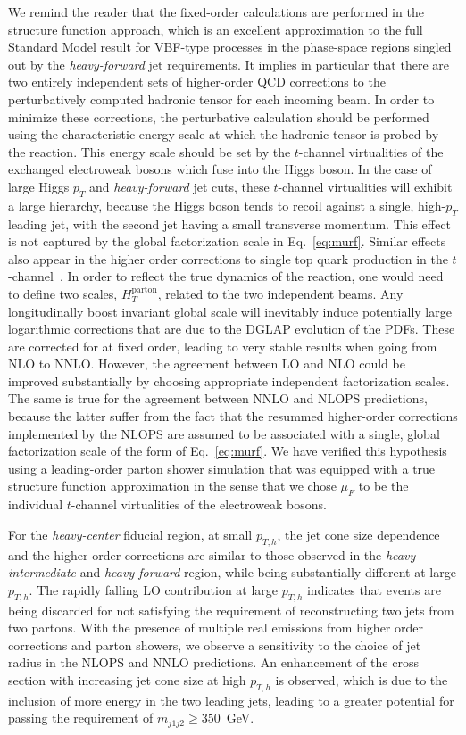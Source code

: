 \documentclass[10pt,prd,fleqn,superscriptaddress,notitlepage,nofootinbib,preprintnumbers,nobalancelastpage]{revtex4-1}
\begin{document}
We remind the reader that the fixed-order calculations are performed in the structure function approach, which is an excellent approximation to the full Standard Model result for VBF-type processes in the phase-space regions singled out by the \textit{heavy-forward} jet requirements. It implies in particular that there are two entirely independent sets of higher-order QCD corrections to the perturbatively computed hadronic tensor for each incoming beam. In order to minimize these corrections, the perturbative calculation should be performed using the characteristic energy scale at which the hadronic tensor is probed by the reaction. This energy scale should be set by the $t$-channel virtualities of the exchanged electroweak bosons which fuse into the Higgs boson. In the case of large Higgs $p_T$ and \textit{heavy-forward} jet cuts, these $t$-channel virtualities will exhibit a large hierarchy, because the Higgs boson tends to recoil against a single, high-$p_T$ leading jet, with the second jet having a small transverse momentum. This effect is not captured by the global factorization scale in Eq.~\eqref{eq:murf}. Similar effects also appear in the higher order corrections to single top quark production in the $t$-channel~\cite{Campbell:2020fhf}. In order to reflect the true dynamics of the reaction, one would need to define two scales, $H_T^{\text{parton}}$, related to the two independent beams. Any longitudinally boost invariant global scale will inevitably induce potentially large logarithmic corrections that are due to the DGLAP evolution of the PDFs. These are corrected for at fixed order, leading to very stable results when going from NLO to NNLO. However, the agreement between LO and NLO could be improved substantially by choosing appropriate independent factorization scales. The same is true for the agreement between NNLO and NLOPS predictions, because the latter suffer from the fact that the resummed higher-order corrections implemented by the NLOPS are assumed to be associated with a single, global factorization scale of the form of Eq.~\eqref{eq:murf}. We have verified this hypothesis using a leading-order parton shower simulation that was equipped with a true structure function approximation in the sense that we chose $\mu_F$ to be the individual $t$-channel virtualities of the electroweak bosons.

For the \textit{heavy-center} fiducial region, at small $p_{T,h}$, the jet cone size dependence and the higher order corrections are similar to those observed in the  \textit{heavy-intermediate} and \textit{heavy-forward} region, while being substantially different at large $p_{T,h}$. The rapidly falling LO contribution at large $p_{T,h}$ indicates that events are being discarded for not satisfying the requirement of reconstructing two jets from two partons.
With the presence of multiple real emissions from higher order corrections and parton showers, we observe a sensitivity to the choice of jet radius  in the NLOPS and NNLO predictions. An enhancement of the cross section with increasing jet cone size at  high $p_{T,h}$ is observed, which is due to the inclusion of more energy  in the two leading jets, leading to a greater potential for passing the requirement of $m_{j1j2} \ge 350$~GeV.
\end{document}
